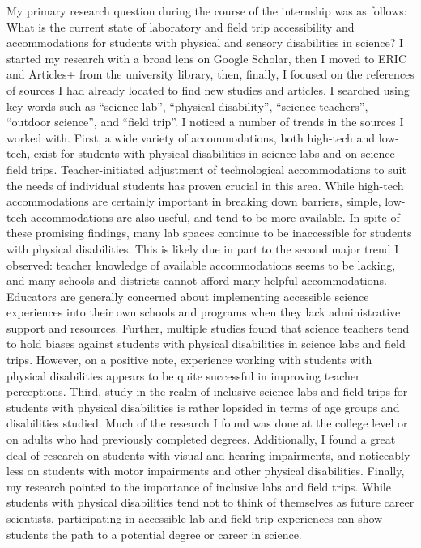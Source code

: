 \documentclass[11.5pt]{sig-alternate}
\begin{document}
\begin{large}
My primary research question during the course of the internship was as follows: What is the current state of laboratory and field trip accessibility and accommodations for students with physical and sensory disabilities in science? I started my research with a broad lens on Google Scholar, then I moved to ERIC and Articles+ from the university library, then, finally, I focused on the references of sources I had already located to find new studies and articles. I searched using key words such as “science lab”, “physical disability”, “science teachers”, “outdoor science”, and “field trip”.  I noticed a number of trends in the sources I worked with. First, a wide variety of accommodations, both high-tech and low-tech, exist for students with physical disabilities in science labs and on science field trips. Teacher-initiated adjustment of technological accommodations to suit the needs of individual students has proven crucial in this area. While high-tech accommodations are certainly important in breaking down barriers, simple, low-tech accommodations are also useful, and tend to be more available. In spite of these promising findings, many lab spaces continue to be inaccessible for students with physical disabilities. This is likely due in part to the second major trend I observed: teacher knowledge of available accommodations seems to be lacking, and many schools and districts cannot afford many helpful accommodations. Educators are generally concerned about implementing accessible science experiences into their own schools and programs when they lack administrative support and resources. Further, multiple studies found that science teachers tend to hold biases against students with physical disabilities in science labs and field trips. However, on a positive note, experience working with students with physical disabilities appears to be quite successful in improving teacher perceptions. Third, study in the realm of inclusive science labs and field trips for students with physical disabilities is rather lopsided in terms of age groups and disabilities studied. Much of the research I found was done at the college level or on adults who had previously completed degrees. Additionally, I found a great deal of research on students with visual and hearing impairments, and noticeably less on students with motor impairments and other physical disabilities. Finally, my research pointed to the importance of inclusive labs and field trips. While students with physical disabilities tend not to think of themselves as future career scientists, participating in accessible lab and field trip experiences can show students the path to a potential degree or career in science. 


\end{large}
\end{document}
